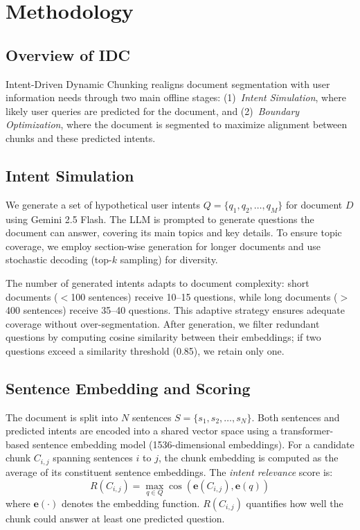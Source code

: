 \documentclass[conference]{IEEEtran}
\begin{document}
\section{Methodology}

\subsection{Overview of IDC}

Intent-Driven Dynamic Chunking realigns document segmentation with user information needs through two main offline stages: (1)~\textit{Intent Simulation}, where likely user queries are predicted for the document, and (2)~\textit{Boundary Optimization}, where the document is segmented to maximize alignment between chunks and these predicted intents.

\subsection{Intent Simulation}

We generate a set of hypothetical user intents $Q = \{q_1, q_2, \ldots, q_M\}$ for document $D$ using Gemini 2.5 Flash. The LLM is prompted to generate questions the document can answer, covering its main topics and key details. To ensure topic coverage, we employ section-wise generation for longer documents and use stochastic decoding (top-$k$ sampling) for diversity.

The number of generated intents adapts to document complexity: short documents ($<$100 sentences) receive 10--15 questions, while long documents ($>$400 sentences) receive 35--40 questions. This adaptive strategy ensures adequate coverage without over-segmentation. After generation, we filter redundant questions by computing cosine similarity between their embeddings; if two questions exceed a similarity threshold (0.85), we retain only one.

\subsection{Sentence Embedding and Scoring}

The document is split into $N$ sentences $S = \{s_1, s_2, \ldots, s_N\}$. Both sentences and predicted intents are encoded into a shared vector space using a transformer-based sentence embedding model (1536-dimensional embeddings). For a candidate chunk $C_{i,j}$ spanning sentences $i$ to $j$, the chunk embedding is computed as the average of its constituent sentence embeddings. The \textit{intent relevance} score is:
\begin{equation}
R(C_{i,j}) = \max_{q \in Q} \cos(\mathbf{e}(C_{i,j}), \mathbf{e}(q))
\end{equation}
where $\mathbf{e}(\cdot)$ denotes the embedding function. $R(C_{i,j})$ quantifies how well the chunk could answer at least one predicted question.
\end{document}
